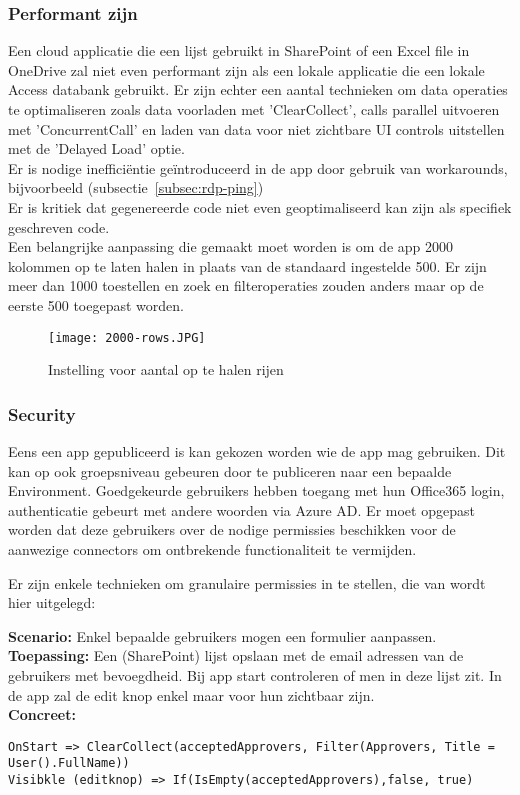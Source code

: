 \subsubsection{Performant zijn}

Een cloud applicatie die een lijst gebruikt in SharePoint of een Excel file in OneDrive zal niet even performant zijn als een lokale applicatie die een lokale Access databank gebruikt. Er zijn echter een aantal technieken om data operaties te optimaliseren zoals data voorladen met 'ClearCollect', calls parallel uitvoeren met 'ConcurrentCall' en laden van data voor niet zichtbare UI controls uitstellen met de 'Delayed Load' optie. \autocite{Andaloussi2018}\\
Er is nodige inefficiëntie geïntroduceerd in de app door gebruik van workarounds, bijvoorbeeld (subsectie~\ref{subsec:rdp-ping})\\
Er is kritiek dat gegenereerde code niet even geoptimaliseerd kan zijn als specifiek geschreven code. \autocite{Shiah2018}\\
Een belangrijke aanpassing die gemaakt moet worden is om de app 2000 kolommen op te laten halen in plaats van de standaard ingestelde 500. Er zijn meer dan 1000 toestellen en zoek en filteroperaties zouden anders maar op de eerste 500 toegepast worden.

\begin{figure}[h!]
    \texttt{[image: 2000-rows.JPG]}
    \caption{Instelling voor aantal op te halen rijen}
    \label{fig:2000-rows}
\end{figure}

\subsubsection{Security}

Eens een app gepubliceerd is kan gekozen worden wie de app mag gebruiken. Dit kan op ook groepsniveau gebeuren door te publiceren naar een bepaalde Environment. Goedgekeurde gebruikers hebben toegang met hun Office365 login, authenticatie gebeurt met andere woorden via Azure AD. Er moet opgepast worden dat deze gebruikers over de nodige permissies beschikken voor de aanwezige connectors om ontbrekende functionaliteit te vermijden.

Er zijn enkele technieken om granulaire permissies in te stellen, die van \textcite{Dunnam2019} wordt hier uitgelegd:

\textbf{Scenario:} Enkel bepaalde gebruikers mogen een formulier aanpassen.\\
\textbf{Toepassing:} Een (SharePoint) lijst opslaan met de email adressen van de gebruikers met bevoegdheid. Bij app start controleren of men in deze lijst zit. In de app zal de edit knop enkel maar voor hun zichtbaar zijn.\\
\textbf{Concreet:} 
\begin{lstlisting}
OnStart => ClearCollect(acceptedApprovers, Filter(Approvers, Title = User().FullName))
Visibkle (editknop) => If(IsEmpty(acceptedApprovers),false, true)
\end{lstlisting} 

